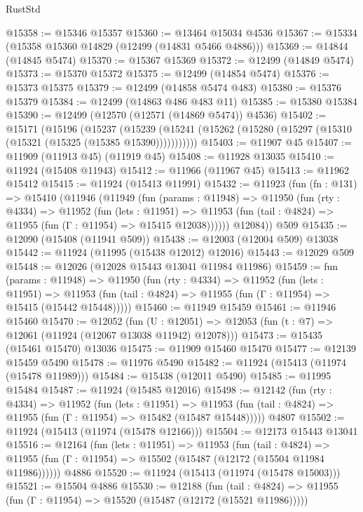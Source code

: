 \begin{lexlean}{RustStd}
\begin{coremodule}
{\begin{coremodule}
{{{{{{{{{{{{{{{{{{{{{{{{{{{{{{{{{{{{{{{{{{{{{{{{{{{{{{{{{{{{{{{{{{{{{{{{{{{{{{{{@15358 := @15346 @15357
@15360 := @13464 @15034 @4536
@15367 := @15334 (@15358 @15360 @14829 (@12499 (@14831 @5466 @4886)))
@15369 := @14844 (@14845 @5474)
@15370 := @15367 @15369
@15372 := @12499 (@14849 @5474)
@15373 := @15370 @15372
@15375 := @12499 (@14854 @5474)
@15376 := @15373 @15375
@15379 := @12499 (@14858 @5474 @483)
@15380 := @15376 @15379
@15384 := @12499 (@14863 @486 @483 @11)
@15385 := @15380 @15384
@15390 := @12499 (@12570 (@12571 (@14869 @5474)) @4536)
@15402 := @15171
    (@15196
      (@15237
        (@15239 (@15241 (@15262 (@15280 (@15297 (@15310 (@15321 (@15325 (@15385 @15390)))))))))))
@15403 := @11907 @45
@15407 := @11909 (@11913 @45) (@11919 @45)
@15408 := @11928 @13035
@15410 := @11924 (@15408 @11943)
@15412 := @11966 (@11967 @45)
@15413 := @11962 @15412
@15415 := @11924 (@15413 @11991)
@15432 := @11923
    (fun (fn : @131) =>
    @15410
      (@11946
        (@11949
          (fun (params : @11948) =>
          @11950
            (fun (rty : @4334) =>
            @11952
              (fun (lets : @11951) =>
              @11953 (fun (tail : @4824) => @11955 (fun (Γ : @11954) => @15415 @12038))))))
        @12084))
    @509
@15435 := @12090 (@15408 (@11941 @509))
@15438 := @12003 (@12004 @509) @13038
@15442 := @11924 (@11995 (@15438 @12012) @12016)
@15443 := @12029 @509
@15448 := @12026 (@12028 @15443 @13041 @11984 @11986)
@15459 := fun (params : @11948) =>
  @11950
    (fun (rty : @4334) =>
    @11952
      (fun (lets : @11951) =>
      @11953 (fun (tail : @4824) => @11955 (fun (Γ : @11954) => @15415 (@15442 @15448)))))
@15460 := @11949 @15459
@15461 := @11946 @15460
@15470 := @12052
    (fun (U : @12051) => @12053 (fun (t : @7) => @12061 (@11924 (@12067 @13038 @11942) @12078)))
@15473 := @15435 (@15461 @15470) @13036
@15475 := @11909 @15460 @15470
@15477 := @12139 @15459 @5490
@15478 := @11976 @5490
@15482 := @11924 (@15413 (@11974 (@15478 @11989)))
@15484 := @15438 (@12011 @5490)
@15485 := @11995 @15484
@15487 := @11924 (@15485 @12016)
@15498 := @12142
    (fun (rty : @4334) =>
    @11952
      (fun (lets : @11951) =>
      @11953 (fun (tail : @4824) => @11955 (fun (Γ : @11954) => @15482 (@15487 @15448)))))
    @4807
@15502 := @11924 (@15413 (@11974 (@15478 @12166)))
@15504 := @12173 @15443 @13041
@15516 := @12164
    (fun (lets : @11951) =>
    @11953
      (fun (tail : @4824) =>
      @11955 (fun (Γ : @11954) => @15502 (@15487 (@12172 (@15504 @11984 @11986))))))
    @4886
@15520 := @11924 (@15413 (@11974 (@15478 @15003)))
@15521 := @15504 @4886
@15530 := @12188
    (fun (tail : @4824) => @11955 (fun (Γ : @11954) => @15520 (@15487 (@12172 (@15521 @11986)))))
}}}}}}}}}}}}}}}}}}}}}}}}}}}}}}}}}}}}}}}}}}}}}}}}}}}}}}}}}}}}}}}}}}}}}}}}}}}}}}}}
\end{coremodule}}
\end{coremodule}
\end{lexlean}
